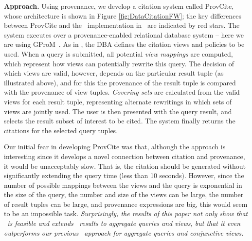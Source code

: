 \textbf{Approach.} Using provenance, we develop a citation system called ProvCite, whose architecture is shown in Figure \ref{fig:DataCitationFW}; the key differences between ProvCite and the \rba\ implementation in~\cite{wu2018data} are indicated by red stars. The system executes over a provenance-enabled relational database system -- here we are using GProM~\cite{arab2018gprom}.
As in \cite{wu2018data}, the DBA defines the citation views and policies to be used.  When a query is submitted, all potential {\em view mappings} are computed, which represent how views can potentially rewrite this query.  The decision of which views are valid, however, depends on the particular result tuple (as illustrated above), and for this the provenance of the result tuple is compared with the provenance of view tuples.  \textit{Covering sets} are calculated from the valid views for each result tuple, representing alternate rewritings in which sets of views are jointly used.  The user is then presented with the query result, and selects the result subset of interest to be cited.  The system finally returns the citations for the selected query tuples. 


Our initial fear in developing ProvCite was that, although the approach is interesting since it develops a novel connection between citation and provenance, it would be unacceptably slow.
That is, the citation should be generated without significantly extending the query time (less than 10 seconds).  However, since the number of possible mappings between the views and the query is exponential in the size of the query, the number and size of the views can be large, the number of result tuples can be large, and provenance expressions are big, this would seem to be an impossible task.  \textit{Surprisingly, the results of this paper not only show that \pba\ is feasible and extends \rba\ results to aggregate queries and views, but that it even outperforms our previous \rba\ approach for aggregate queries and conjunctive views.}


